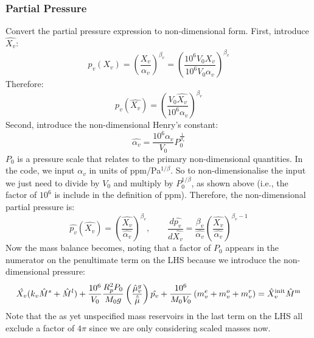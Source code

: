 \subsubsection{Partial Pressure}
Convert the partial pressure expression to non-dimensional form.  First, introduce $\hat{X_v}$:
\begin{equation}
p_v( X_v ) = \left( \frac{X_v}{\alpha_v} \right)^{\beta_v}
 = \left( \frac{10^6 V_0 X_v}{10^6 V_0 \alpha_v} \right)^{\beta_v}
 \end{equation}
Therefore:
\begin{equation}
p_v( \hat{X_v} ) = \left( \frac{V_0 \hat{X_v}}{10^6 \alpha_v} \right)^{\beta_v}
\end{equation}
Second, introduce the non-dimensional Henry's constant:
\begin{equation}
\hat{\alpha_v} = \frac{10^6 \alpha_v}{V_0} P_0^\frac{1}{\beta_v}
\end{equation}
$P_0$ is a pressure scale that relates to the primary non-dimensional quantities.  In the code, we input $\alpha_v$ in units of ppm/Pa$^{1/\beta}$.  So to non-dimensionalise the input we just need to divide by $V_0$ and multiply by $P_0^{1/\beta}$, as shown above (i.e., the factor of $10^6$ is include in the definition of ppm).  Therefore, the non-dimensional partial pressure is:
\begin{equation}
\hat{p_v} ( \hat{X_v} ) = \left( \frac{\hat{X_v}}{\hat{\alpha_v}} \right) ^ {\beta_v}, \qquad \frac{d \hat{p_v}}{d \hat{X_v}} = \frac{\beta_v}{\hat{\alpha_v}} \left( \frac{\hat{X_v}}{\hat{\alpha_v}} \right)^{\beta_v-1}
\end{equation}
Now the mass balance becomes, noting that a factor of $P_0$ appears in the numerator on the penultimate term on the LHS because we introduce the non-dimensional pressure:
\begin{equation}
\hat{X_v} (k_v \hat{M}^s + \hat{M}^l) + \frac{10^6}{V_0} \frac{R_p^2 P_0}{M_0 g} \left( \frac{\hat{\mu}_v^g}{\hat{\bar{\mu}}} \right) \hat{p_v} + \frac{10^6}{M_0 V_0} \left( m_v^e + m_v^o + m_v^r \right) = \hat{X}_v^{\rm init} \hat{M}^{\rm m}
\end{equation}
Note that the as yet unspecified mass reservoirs in the last term on the LHS all exclude a factor of $4\pi$ since we are only considering scaled masses now.
